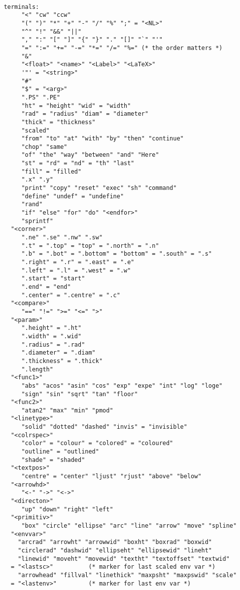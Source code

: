 \documentclass[11pt]{article}
\begin{document}
\begin{verbatim}
    
    terminals:
         "<" "cw" "ccw"
         "(" ")" "*" "+" "-" "/" "%" ";" = "<NL>"
         "^" "!" "&&" "||" 
         "," ":" "[" "]" "{" "}" "." "[]" "`" "'"
         "=" ":=" "+=" "-=" "*=" "/=" "%=" (* the order matters *)
         "&"
         "<float>" "<name>" "<Label>" "<LaTeX>"
         '"' = "<string>"
         "#"
         "$" = "<arg>"
         ".PS" ".PE"
         "ht" = "height" "wid" = "width"
         "rad" = "radius" "diam" = "diameter"
         "thick" = "thickness"
         "scaled"
         "from" "to" "at" "with" "by" "then" "continue"
         "chop" "same"
         "of" "the" "way" "between" "and" "Here"
         "st" = "rd" = "nd" = "th" "last"
         "fill" = "filled"
         ".x" ".y"
         "print" "copy" "reset" "exec" "sh" "command"
         "define" "undef" = "undefine"
         "rand"
         "if" "else" "for" "do" "<endfor>"
         "sprintf"
      "<corner>"
         ".ne" ".se" ".nw" ".sw"
         ".t" = ".top" = "top" = ".north" = ".n"
         ".b" = ".bot" = ".bottom" = "bottom" = ".south" = ".s"
         ".right" = ".r" = ".east" = ".e"
         ".left" = ".l" = ".west" = ".w"
         ".start" = "start"
         ".end" = "end"
         ".center" = ".centre" = ".c"
      "<compare>"
         "==" "!=" ">=" "<=" ">"
      "<param>"
         ".height" = ".ht"
         ".width" = ".wid"
         ".radius" = ".rad"
         ".diameter" = ".diam"
         ".thickness" = ".thick"
         ".length"
      "<func1>"
         "abs" "acos" "asin" "cos" "exp" "expe" "int" "log" "loge"
         "sign" "sin" "sqrt" "tan" "floor"
      "<func2>"
         "atan2" "max" "min" "pmod"
      "<linetype>"
         "solid" "dotted" "dashed" "invis" = "invisible"
      "<colrspec>"
         "color" = "colour" = "colored" = "coloured"
         "outline" = "outlined"
         "shade" = "shaded"
      "<textpos>"
         "centre" = "center" "ljust" "rjust" "above" "below"
      "<arrowhd>"
         "<-" "->" "<->"
      "<directon>"
         "up" "down" "right" "left"
      "<primitiv>"
         "box" "circle" "ellipse" "arc" "line" "arrow" "move" "spline"
      "<envvar>"
        "arcrad" "arrowht" "arrowwid" "boxht" "boxrad" "boxwid"
        "circlerad" "dashwid" "ellipseht" "ellipsewid" "lineht"
        "linewid" "moveht" "movewid" "textht" "textoffset" "textwid"
      = "<lastsc>"          (* marker for last scaled env var *)
        "arrowhead" "fillval" "linethick" "maxpsht" "maxpswid" "scale" 
      = "<lastenv>"         (* marker for last env var *)
\end{verbatim}
\end{document}
